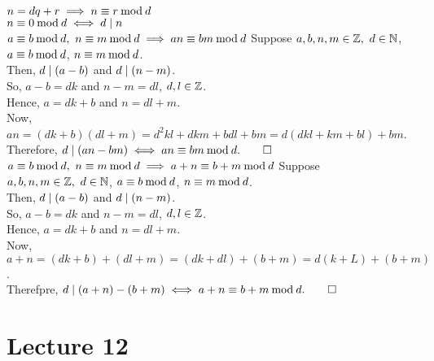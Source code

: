 \documentclass{report}
\begin{document}


\Claim $n = dq + r \implies n \equiv r \mathbin{\mathrm{mod}} d$ \\
\Claim $n \equiv 0 \mathbin{\mathrm{mod}} d \iff d\mathrel{\mid} n$ \\

\Lemma $a\equiv b\mathbin{\mathrm{mod}} d,\ n\equiv m\mathbin{\mathrm{mod}} d \implies an \equiv bm \mathbin{\mathrm{mod}} d$
\proof Suppose $a,b,n,m\in\mathbb{Z},\ d\in\mathbb{N}$, $a\equiv b\mathbin{\mathrm{mod}} d$, $n\equiv m\mathbin{\mathrm{mod}} d$. \\
Then, $d\mathrel{\mid} (a-b)$ and $d\mathrel{\mid} (n-m)$. \\
So, $a-b = dk$ and $n-m = dl$, $d,l\in\mathbb{Z}$. \\
Hence, $a = dk+b$ and $n = dl+m$. \\
Now, $an = (dk+b)(dl+m) = d^2kl + dkm + bdl + bm = d(dkl + km + bl) + bm$. \\
Therefore, $d\divs (an - bm) \iff an \equiv bm \Mod d. \QED$ \\

\Lemma $a\equiv b\mathbin{\mathrm{mod}} d,\ n\equiv m\mathbin{\mathrm{mod}} d \implies a+n \equiv b+m \mathbin{\mathrm{mod}} d$
\proof Suppose $a,b,n,m\in\mathbb{Z},\ d\in\mathbb{N}$, $a\equiv b\mathbin{\mathrm{mod}} d$, $n\equiv m\mathbin{\mathrm{mod}} d$. \\
Then, $d\mathrel{\mid} (a-b)$ and $d\mathrel{\mid} (n-m)$. \\
So, $a-b = dk$ and $n-m = dl$, $d,l\in\mathbb{Z}$. \\
Hence, $a = dk+b$ and $n = dl+m$. \\
Now, $a + n = (dk+b)+(dl+m) = (dk+dl) + (b + m) = d(k+L) + (b+m)$. \\
Therefpre, $d\divs (a + n) - (b+m) \iff a+n \equiv b+m \Mod d. \QED$  

\section{Lecture 12}
\end{document}
